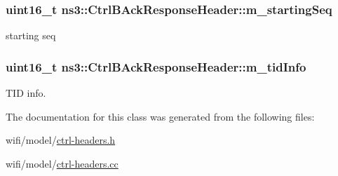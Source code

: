 \subsubsection[{\texorpdfstring{m\+\_\+starting\+Seq}{m_startingSeq}}]{\setlength{\rightskip}{0pt plus 5cm}uint16\+\_\+t ns3\+::\+Ctrl\+B\+Ack\+Response\+Header\+::m\+\_\+starting\+Seq\hspace{0.3cm}{\ttfamily [private]}}\hypertarget{classns3_1_1CtrlBAckResponseHeader_a9f30acf62831999d1895ba3d0677f732}{}\label{classns3_1_1CtrlBAckResponseHeader_a9f30acf62831999d1895ba3d0677f732}


starting seq 

\subsubsection[{\texorpdfstring{m\+\_\+tid\+Info}{m_tidInfo}}]{\setlength{\rightskip}{0pt plus 5cm}uint16\+\_\+t ns3\+::\+Ctrl\+B\+Ack\+Response\+Header\+::m\+\_\+tid\+Info\hspace{0.3cm}{\ttfamily [private]}}\hypertarget{classns3_1_1CtrlBAckResponseHeader_aa432979d431ad677830267efa97959da}{}\label{classns3_1_1CtrlBAckResponseHeader_aa432979d431ad677830267efa97959da}


T\+ID info. 



The documentation for this class was generated from the following files\+:\begin{DoxyCompactItemize}
\item 
wifi/model/\hyperlink{ctrl-headers_8h}{ctrl-\/headers.\+h}\item 
wifi/model/\hyperlink{ctrl-headers_8cc}{ctrl-\/headers.\+cc}\end{DoxyCompactItemize}
